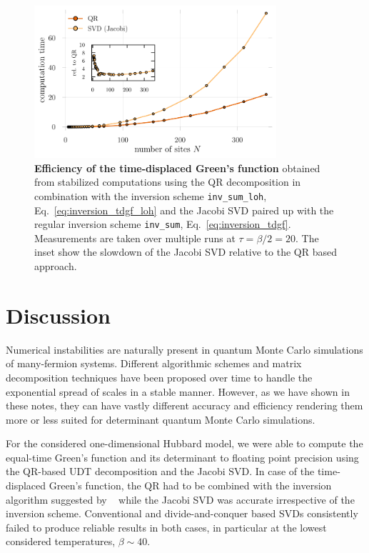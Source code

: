 \documentclass[submission, Phys]{SciPost}
\begin{document}
\begin{figure}[t]
	\centering
	\includegraphics[width=0.8\textwidth]{figures/benchmark_jacobi_vs_qr_tdgf.pdf}
	\caption{\textbf{Efficiency of the time-displaced Green's function} obtained from stabilized computations using the QR decomposition in combination with the inversion scheme \texttt{inv\_sum\_loh}, Eq.~\eqref{eq:inversion_tdgf_loh} and the Jacobi SVD paired up with the regular inversion scheme \texttt{inv\_sum}, Eq.~\eqref{eq:inversion_tdgf}. Measurements are taken over multiple runs at $\tau = \beta/2 = 20$. The inset show the slowdown of the Jacobi SVD relative to the QR based approach. \label{fig:tdgf_benchmark}}
\end{figure}

\section{Discussion}\label{sec:discussion}

Numerical instabilities are naturally present in quantum Monte Carlo simulations of many-fermion systems. Different algorithmic schemes and matrix decomposition techniques have been proposed over time to handle the exponential spread of scales in a stable manner. However, as we have shown in these notes, they can have vastly different accuracy and efficiency rendering them more or less suited for determinant quantum Monte Carlo simulations.

For the considered one-dimensional Hubbard model, we were able to compute the equal-time Green's function and its determinant to floating point precision using the QR-based UDT decomposition and the Jacobi SVD. In case of the time-displaced Green's function, the QR had to be combined with the inversion algorithm suggested by ~\cite{Loh1989} while the Jacobi SVD was accurate irrespective of the inversion scheme. Conventional and divide-and-conquer based SVDs consistently failed to produce reliable results in both cases, in particular at the lowest considered temperatures, $\beta \sim 40$.
\end{document}
